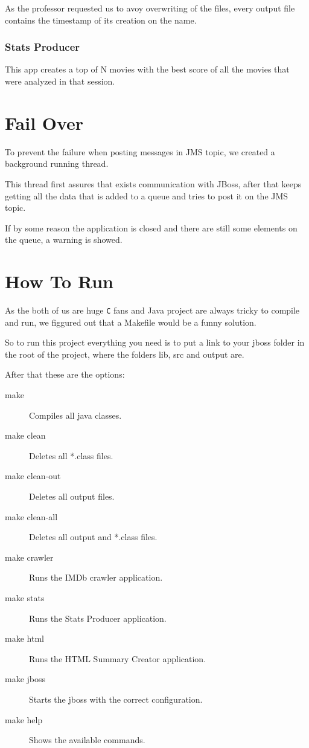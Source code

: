 \documentclass[a4paper]{article}
\begin{document}
As the professor requested us to avoy overwriting of the files, every output file contains the timestamp of its creation on the name.

\subsubsection{Stats Producer}
\indent \indent This app creates a top of N movies with the best score of all the movies that were analyzed in that session.

\section{Fail Over}
\indent \indent To prevent the failure when posting messages in JMS topic, we created a background running thread.

This thread first assures that exists communication with JBoss, after that keeps getting all the data that is added to a queue and tries to post it on the JMS topic.

If by some reason the application is closed and there are still some elements on the queue, a warning is showed.

\clearpage
\section{How To Run}
\indent \indent As the both of us are huge \texttt{C} fans and Java project are always tricky to compile and run, we figgured out that a Makefile would be a funny solution.

So to run this project everything you need is to put a link to your jboss folder in the root of the project, where the folders lib, src and output are.

After that these are the options:
\begin{description}
	\item [make]
		Compiles all java classes.
	\item [make clean]
		Deletes all *.class files.
	\item [make clean-out]
		Deletes all output files.
	\item [make clean-all]
		Deletes all output and *.class files.
	\item [make crawler]
		Runs the IMDb crawler application.
	\item [make stats]
		Runs the Stats Producer application.
	\item [make html]
		Runs the HTML Summary Creator application.
	\item [make jboss]
		Starts the jboss with the correct configuration.
	\item [make help]
		Shows the available commands.
\end{description}
\end{document}
